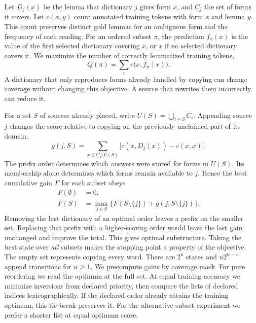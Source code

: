 \documentclass[11pt]{article}
\begin{document}
Let \(D_j(x)\) be the lemma that dictionary \(j\) gives form \(x\), and
\(C_j\) the set of forms it covers. Let \(c(x,y)\) count annotated training
tokens with form \(x\) and lemma \(y\). This count preserves distinct gold
lemmas for an ambiguous form and the frequency of each reading. For an ordered
subset \(\pi\), the prediction \(f_\pi(x)\) is the value of the first selected
dictionary covering \(x\), or \(x\) if no selected dictionary covers it.
We maximize the number of correctly lemmatized training tokens,
\begin{equation}
  Q(\pi) = \sum_x c\bigl(x,f_\pi(x)\bigr).
  \label{eq:objective}
\end{equation}
A dictionary that only reproduces forms already handled by copying can change
coverage without changing this objective. A source that rewrites them
incorrectly can reduce it.

For a set \(S\) of sources already placed, write
\(U(S)=\bigcup_{i\in S}C_i\). Appending source \(j\) changes the score
relative to copying on the previously unclaimed part of its domain.
\begin{equation}
  g(j,S)=\sum_{x\in C_j\setminus U(S)}
     \bigl[c(x,D_j(x))-c(x,x)\bigr].
  \label{eq:gain}
\end{equation}
The prefix order determines which answers were stored for forms in
\(U(S)\). Its membership alone determines which forms remain available to
\(j\). Hence the best cumulative gain \(F\) for each subset obeys
\begin{align}
  F(\emptyset)&=0, \nonumber\\
  F(S)&=\max_{j\in S}
     \{F(S\setminus\{j\})+g(j,S\setminus\{j\})\}.
  \label{eq:recurrence}
\end{align}
Removing the last dictionary of an optimal order leaves a prefix on the
smaller set. Replacing that prefix with a higher-scoring order would leave
the last gain unchanged and improve the total. This gives optimal
substructure. Taking the best state over \emph{all} subsets makes the
stopping point a property of the objective. The empty set represents
copying every word. There are \(2^n\) states and \(n2^{n-1}\) append transitions for
\(n\geq1\). We precompute gains by coverage mask. For pure reordering we
read the optimum at the full set. At equal training accuracy we minimize
inversions from declared priority, then compare the lists of declared indices
lexicographically. If the declared order already attains the training
optimum, this tie-break preserves it. For the alternative subset experiment we prefer a
shorter list at equal optimum score.
\end{document}

